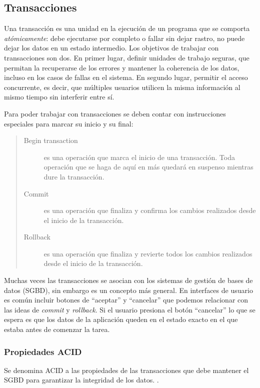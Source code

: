 \subsection{Transacciones}	

Una transacción es una unidad en la ejecución de un programa que se comporta 
\emph{atómicamente}: debe ejecutarse por completo o fallar sin dejar rastro, no
puede dejar los datos en un estado intermedio.
Los objetivos de trabajar con transacciones son dos.
En primer lugar, definir unidades de trabajo seguras, que permitan la
recuperarse de los errores y mantener la coherencia de los datos, incluso en
los casos de fallas en el sistema.
En segundo lugar, permitir el acceso concurrente, es decir, que múltiples
usuarios utilicen la misma información al mismo tiempo sin interferir entre sí.

Para poder trabajar con transacciones se deben contar con instrucciones
especiales para marcar su inicio y su final:
\begin{quote}
	\begin{description}
		\item[Begin transaction] es una operación que marca el inicio de una
		transacción. Toda operación que se haga de aquí en más quedará en suspenso
		mientras dure la transacción.
	
		\item[Commit] es una operación que finaliza y confirma los
		cambios realizados desde el inicio de la transacción. 
		
		\item[Rollback] es una operación que finaliza y revierte todos los cambios
		realizados desde el inicio de la transacción.
	\end{description}
\end{quote}
   
\bigskip

Muchas veces las transacciones se asocian con los sistemas de gestión de bases
de datos (SGBD), sin embargo es un concepto más general.
En interfaces de usuario es común incluir botones de
``aceptar'' y ``cancelar'' que podemos relacionar con las ideas de
\emph{commit} y \emph{rollback}. 
Si el usuario presiona el botón ``cancelar'' lo que se espera
es que los datos de la aplicación queden en el estado exacto en el que estaba
antes de comenzar la tarea.

\bigskip

\subsubsection{Propiedades ACID}
\label{sec:ACID}
Se denomina ACID a las propiedades de las transacciones que debe mantener el
SGBD para garantizar la integridad de los datos. \cite{HaerderReuter83}.

